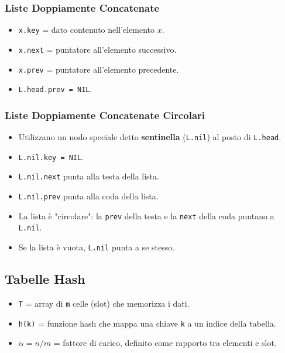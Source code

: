 \subsubsection{Liste Doppiamente Concatenate}
\begin{itemize}
    \item \texttt{x.key} = dato contenuto nell'elemento $x$.
    \item \texttt{x.next} = puntatore all'elemento successivo.
    \item \texttt{x.prev} = puntatore all'elemento precedente.
    \item \texttt{L.head.prev = NIL}.
\end{itemize}

\subsubsection{Liste Doppiamente Concatenate Circolari}
\begin{itemize}
    \item Utilizzano un nodo speciale detto \textbf{sentinella} (\texttt{L.nil}) al posto di \texttt{L.head}.
    \item \texttt{L.nil.key = NIL}.
    \item \texttt{L.nil.next} punta alla testa della lista.
    \item \texttt{L.nil.prev} punta alla coda della lista.
    \item La lista è "circolare": la \texttt{prev} della testa e la \texttt{next} della coda puntano a \texttt{L.nil}.
    \item Se la lista è vuota, \texttt{L.nil} punta a se stesso.
\end{itemize}

\subsection{Tabelle Hash}
\begin{itemize}
    \item \texttt{T} = array di \texttt{m} celle (slot) che memorizza i dati.
    \item \texttt{h(k)} = funzione hash che mappa una chiave \texttt{k} a un indice della tabella.
    \item \texttt{$\alpha=n/m$} = fattore di carico, definito come rapporto tra elementi e slot.
\end{itemize}